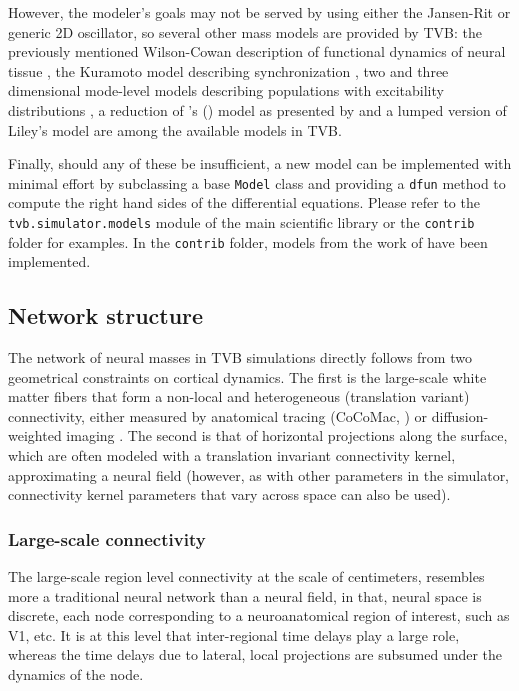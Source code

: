 \documentclass{bioinfo}
\begin{document}
	However, the modeler's goals may not be served by using either the Jansen-Rit
	 or generic 2D oscillator, so several other mass models are
	provided by TVB: the previously mentioned Wilson-Cowan description of
	functional dynamics of neural tissue \citep{Wilson_1972}, the Kuramoto
	model describing synchronization \citep{Kuramoto_1975, Cabral_2011}, two
	and three dimensional mode-level models describing populations with
	excitability distributions \citep{Stefanescu_2011, Stefanescu_2008}, a
	reduction of \citeauthor{Wong_2006}'s (\citeyear{Wong_2006}) model as presented 
    by
	\cite{Deco_2013} and a lumped version of 
    Liley's model \citep{Liley_1999, Steyn-Ross_1999} 
    are among the available models in TVB.

	Finally, should any of these be insufficient, a new model can be implemented
	with minimal effort by subclassing a base \texttt{Model} class and
	providing a  \texttt{dfun} method to compute the right hand sides of the
	differential  equations. Please refer to the \texttt{tvb.simulator.models}
    module of the main scientific library or the \texttt{contrib} folder
    for
	examples. In the \texttt{contrib} folder, models from the work of 
	\cite{Larter_1999, Breakspear_2003, Morris_1981, Hindmarsh_1984, Brunel_2001}
	have been implemented.

\subsection{Network structure}

	The network of neural masses in TVB simulations directly follows from  two
	 geometrical constraints on cortical dynamics. The first is the
	large-scale white matter fibers that form a non-local and heterogeneous
	(translation variant) connectivity, either measured by anatomical tracing
	(CoCoMac, \cite{Koetter_2004}) or diffusion-weighted imaging 
    \citep{Hagmann_2008, Honey_2009, Bastiani_2012}.
    The second is that of horizontal projections
	along the surface, which are often modeled with a translation invariant
    connectivity kernel, approximating a neural field (however, as with other
    parameters in the simulator, connectivity kernel parameters that vary 
	across space can also be used).

	\subsubsection{Large-scale connectivity}

	The large-scale region level connectivity at the scale of centimeters,
	resembles more a traditional neural network than a neural field, in that,
	neural space is discrete,  each node corresponding to a neuroanatomical
	region of interest, such as V1, etc. It is at this level that inter-regional 
	time delays play a large role, whereas the time delays due to 
	lateral, local projections are subsumed under the dynamics of the node.
\end{document}
